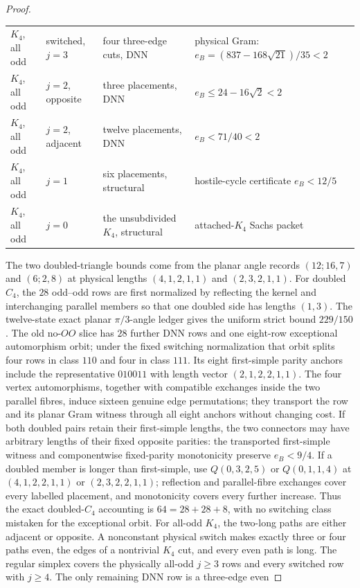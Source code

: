 \documentclass[11pt]{article}
\theoremstyle{remark}
\begin{document}
\begin{proof}
\begin{center}
\begin{tabular}{p{2.4cm}p{3.3cm}p{3.0cm}p{3.2cm}}
$K_4$, all odd&switched, $j=3$&four three-edge cuts, DNN&physical Gram: $e_B=(837-168\sqrt{21})/35<2$\\
$K_4$, all odd&$j=2$, opposite&three placements, DNN&$e_B\leq24-16\sqrt2<2$\\
$K_4$, all odd&$j=2$, adjacent&twelve placements, DNN&$e_B<71/40<2$\\
$K_4$, all odd&$j=1$&six placements, structural&hostile-cycle certificate $e_B<12/5$\\
$K_4$, all odd&$j=0$&the unsubdivided $K_4$, structural&attached-$K_4$ Sachs packet\\
\bottomrule
\end{tabular}
\end{center}
The two doubled-triangle bounds come from the planar angle records
$(12;16,7)$ and $(6;2,8)$ at physical lengths $(4,1,2,1,1)$ and
$(2,3,2,1,1)$.  For doubled $C_4$, the $28$ odd--odd rows are first normalized by reflecting
the kernel and interchanging parallel members so that one doubled side has
lengths $(1,3)$.  The twelve-state exact planar $\pi/3$-angle ledger gives the
uniform strict bound $229/150$.  The old no-$OO$ slice has $28$ further DNN
rows and one eight-row exceptional automorphism orbit; under the fixed
switching normalization that orbit splits four rows in class $110$ and four
in class $111$.  Its eight first-simple parity anchors include the
representative $010011$ with length vector $(2,1,2,2,1,1)$.  The four vertex
automorphisms, together with compatible exchanges inside the two parallel
fibres, induce sixteen genuine edge permutations; they transport the row and
its planar Gram witness through all eight anchors without changing cost.  If
both doubled pairs retain their first-simple lengths, the two connectors may
have arbitrary lengths of their fixed opposite parities: the transported
first-simple witness and componentwise fixed-parity monotonicity preserve
$e_B<9/4$.  If a doubled member is longer than first-simple, use
$Q(0,3,2,5)$ or $Q(0,1,1,4)$ at $(4,1,2,2,1,1)$ or
$(2,3,2,2,1,1)$; reflection and parallel-fibre exchanges cover every labelled
placement, and monotonicity covers every further increase.  Thus the exact
doubled-$C_4$ accounting is $64=28+28+8$, with no switching class mistaken
for the exceptional orbit.
For all-odd $K_4$, the two-long paths are either adjacent or
opposite.  A nonconstant physical switch makes exactly three or four paths
even, the edges of a nontrivial $K_4$ cut, and every even path is long.
The regular simplex covers the physically all-odd $j\geq3$ rows and every
switched row with $j\geq4$.  The only remaining DNN row is a three-edge even

\end{proof}
\end{document}
